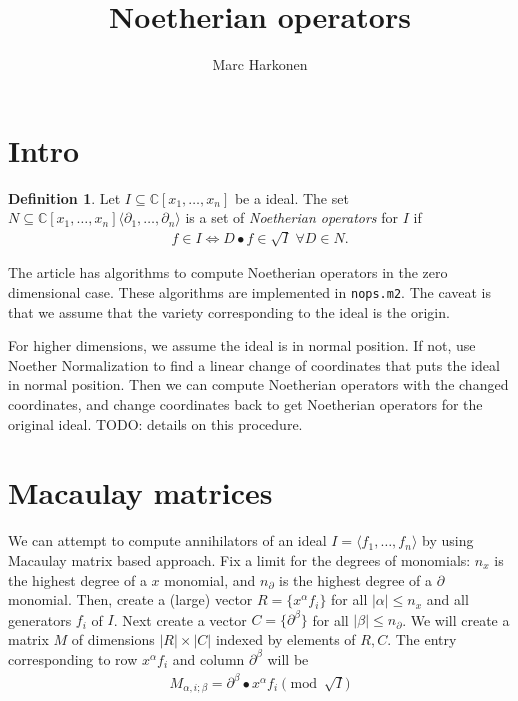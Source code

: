 \documentclass[letterpaper]{article}
\title{Noetherian operators}
\author{Marc Harkonen}
\theoremstyle{plain}
\theoremstyle{definition}
\newtheorem{definition}[theorem]{Definition}
\theoremstyle{remark}
\begin{document}
\maketitle
\section{Intro} %
\label{sec:intro}
\begin{definition}
	Let $I \subseteq \mathbb{C}[x_1,\dotsc,x_n]$ be a ideal. The set $N \subseteq \mathbb{C}[x_1,\dotsc,x_n]\langle \partial_1 ,\dotsc, \partial_n \rangle$ is a set of \emph{Noetherian operators} for $I$ if
	\begin{align*}
		f \in I \iff D \bullet f \in \sqrt{I} \; \forall D \in N.
	\end{align*}
\end{definition}

The article \cite{damiano} has algorithms to compute Noetherian operators in the zero dimensional case. These algorithms are implemented in \texttt{nops.m2}. The caveat is that we assume that the variety corresponding to the ideal is the origin.

For higher dimensions, we assume the ideal is in normal position. If not, use Noether Normalization to find a linear change of coordinates that puts the ideal in normal position. Then we can compute Noetherian operators with the changed coordinates, and change coordinates back to get Noetherian operators for the original ideal. TODO: details on this procedure.


\section{Macaulay matrices} %
\label{sec:macaulay_matrices}
We can attempt to compute annihilators of an ideal $I = \langle f_1,\dotsc,f_n \rangle$ by using Macaulay matrix based approach. Fix a limit for the degrees of monomials: $n_x$ is the highest degree of a $x$ monomial, and $n_\partial$ is the highest degree of a $\partial$ monomial. Then, create a (large) vector $R = \{x^\alpha f_i\}$ for all $|\alpha| \leq n_x$ and all generators $f_i$ of $I$. Next create a vector $C = \{\partial^\beta\}$ for all $|\beta| \leq n_\partial$. We will create a matrix $M$ of dimensions $|R| \times |C|$ indexed by elements of $R,C$. The entry corresponding to row $x^\alpha f_i$ and column $\partial^\beta$ will be
\begin{align}
	M_{\alpha,i;\beta} = \partial^\beta \bullet x^\alpha f_i \pmod{\sqrt I} \label{eq:macaulay_matrix_entries}
\end{align}
\end{document}

